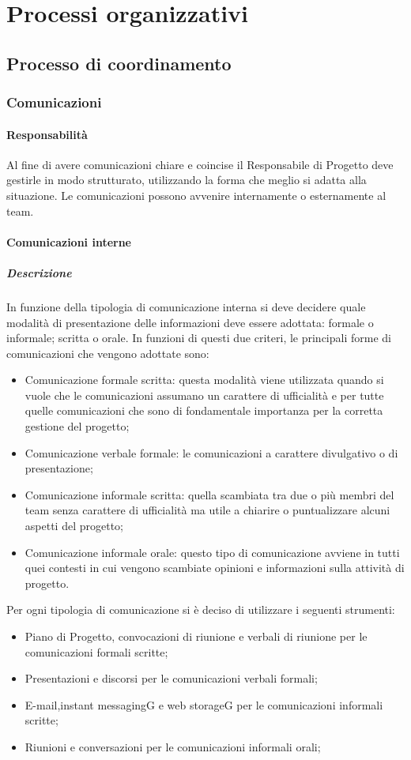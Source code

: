 
\section{Processi organizzativi}

\subsection{Processo di coordinamento}
\subsubsection{Comunicazioni}
\paragraph{Responsabilità}
Al fine di avere comunicazioni chiare e coincise il Responsabile di Progetto deve gestirle in modo strutturato, utilizzando la forma che meglio si adatta alla situazione.
Le comunicazioni possono avvenire internamente o esternamente al team.
\paragraph{Comunicazioni interne}
\subparagraph{Descrizione}
In funzione della tipologia di comunicazione interna si deve decidere quale modalità di presentazione delle informazioni deve essere adottata: formale o informale; scritta o orale.
In funzioni di questi due criteri, le principali forme di comunicazioni che vengono adottate sono:
\begin{itemize}
\item
Comunicazione formale scritta: questa modalità viene utilizzata quando si vuole che le comunicazioni assumano un carattere di ufficialità e per tutte quelle comunicazioni che sono di fondamentale importanza per la corretta gestione del progetto;
\item
Comunicazione verbale formale: le comunicazioni a carattere divulgativo o di presentazione;
\item
Comunicazione informale scritta: quella scambiata tra due o più membri del team senza carattere di ufficialità ma utile a chiarire o puntualizzare alcuni aspetti del progetto;
\item
Comunicazione informale orale: questo tipo di comunicazione avviene in tutti quei contesti in cui vengono scambiate opinioni e informazioni sulla attività di progetto.
\end{itemize}

Per ogni tipologia di comunicazione si è deciso di utilizzare i seguenti strumenti:
\begin{itemize}
\item
Piano di Progetto, convocazioni di riunione e verbali di riunione per le comunicazioni formali scritte;
\item
Presentazioni e discorsi per le comunicazioni verbali formali; 
\item
E-mail,instant messagingG e web storageG per le comunicazioni informali scritte;
\item
Riunioni e conversazioni per le comunicazioni informali orali; 
\end{itemize}

